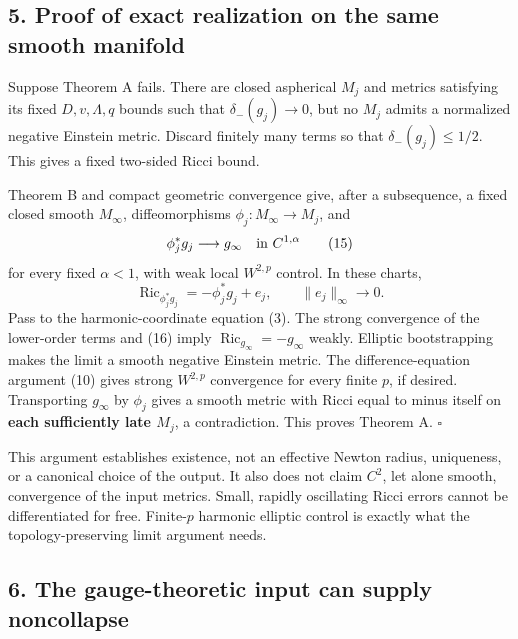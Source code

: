 \documentclass[
  11pt,
]{article}
\begin{document}
\hypertarget{proof-of-exact-realization-on-the-same-smooth-manifold}{%
\subsection{5. Proof of exact realization on the same smooth
manifold}\label{proof-of-exact-realization-on-the-same-smooth-manifold}}

Suppose Theorem A fails. There are closed aspherical \(M_j\) and metrics
satisfying its fixed \(D,v,\Lambda,q\) bounds such that
\(\delta_-(g_j)\to0\), but no \(M_j\) admits a normalized negative
Einstein metric. Discard finitely many terms so that
\(\delta_-(g_j)\le1/2\). This gives a fixed two-sided Ricci bound.

Theorem B and compact geometric convergence give, after a subsequence, a
fixed closed smooth \(M_\infty\), diffeomorphisms
\(\phi_j:M_\infty\to M_j\), and \[
                       \phi_j^*g_j\longrightarrow g_\infty
                              \quad\hbox{in }C^{1,\alpha}
                                                               \tag{15}
\] for every fixed \(\alpha<1\), with weak local \(W^{2,p}\) control. In
these charts, \[
     \operatorname{Ric}_{\phi_j^*g_j}=-\phi_j^*g_j+e_j,
                         \qquad\|e_j\|_\infty\to0.       \tag{16}
\] Pass to the harmonic-coordinate equation (3). The strong convergence
of the lower-order terms and (16) imply
\(\operatorname{Ric}_{g_\infty}=-g_\infty\) weakly. Elliptic
bootstrapping makes the limit a smooth negative Einstein metric. The
difference-equation argument (10) gives strong \(W^{2,p}\) convergence
for every finite \(p\), if desired. Transporting \(g_\infty\) by
\(\phi_j\) gives a smooth metric with Ricci equal to minus itself on
\textbf{each sufficiently late \(M_j\)}, a contradiction. This proves
Theorem A. \(\square\)

This argument establishes existence, not an effective Newton radius,
uniqueness, or a canonical choice of the output. It also does not claim
\(C^2\), let alone smooth, convergence of the input metrics. Small,
rapidly oscillating Ricci errors cannot be differentiated for free.
Finite-\(p\) harmonic elliptic control is exactly what the
topology-preserving limit argument needs.

\hypertarget{the-gauge-theoretic-input-can-supply-noncollapse}{%
\subsection{6. The gauge-theoretic input can supply
noncollapse}\label{the-gauge-theoretic-input-can-supply-noncollapse}}
\end{document}
